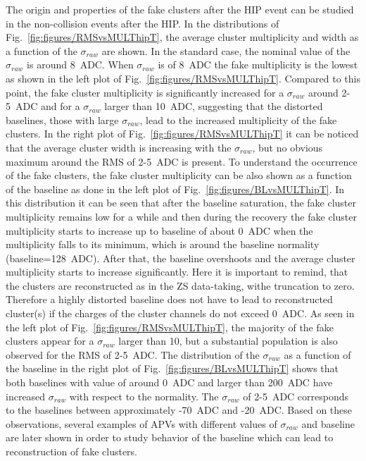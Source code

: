 The origin and properties of the fake clusters after the HIP event can be studied in the non-collision events after the HIP. In the distributions of Fig.~\ref{fig:figures/RMSvsMULThipT}, the average cluster multiplicity and width as a function of the $\sigma_{raw}$ are shown. In the standard case, the nominal value of the $\sigma_{raw}$ is around 8~ADC. When $\sigma_{raw}$ is of 8~ADC the fake multiplicity is the lowest as shown in the left plot of Fig.~\ref{fig:figures/RMSvsMULThipT}. Compared to this point, the fake cluster multiplicity is significantly increased for a $\sigma_{raw}$  around 2-5~ADC and for a $\sigma_{raw}$ larger than 10~ADC, suggesting that the distorted baselines, those with large $\sigma_{raw}$, lead to the increased multiplicity of the fake clusters. In the right plot of Fig.~\ref{fig:figures/RMSvsMULThipT} it can be noticed that the average cluster width is increasing with the $\sigma_{raw}$, but no obvious maximum around the RMS of 2-5~ADC is present. To understand the occurrence of the fake clusters, the fake cluster multiplicity can be also shown as a function of the baseline as done in the left plot of Fig.~\ref{fig:figures/BLvsMULThipT}. In this distribution it can be seen that after the baseline saturation, the fake cluster multiplicity remains low for a while and then during the recovery the fake cluster multiplicity starts to increase up to baseline of about 0~ADC when the multiplicity falls to its minimum, which is around the baseline normality (baseline=128~ADC). After that, the baseline overshoots and the average cluster multiplicity starts to increase significantly. Here it is important to remind, that the clusters are reconstructed as in the ZS data-taking, withe truncation to zero. Therefore a highly distorted baseline does not have to lead to reconstructed cluster(s) if the charges of the cluster channels do not exceed 0~ADC.  As seen in the left plot of Fig.~\ref{fig:figures/RMSvsMULThipT}, the majority of the fake clusters appear for a $\sigma_{raw}$ larger than 10, but a substantial population is also observed for the RMS of 2-5~ADC. The distribution of the $\sigma_{raw}$ as a function of the baseline in the right plot of Fig.~\ref{fig:figures/BLvsMULThipT} shows that both baselines with value of around 0~ADC and larger than 200~ADC have increased $\sigma_{raw}$ with respect to the normality. The $\sigma_{raw}$ of 2-5~ADC corresponds to the baselines between approximately -70~ADC and -20~ADC. Based on these observations, several examples of APVs with different values of $\sigma_{raw}$ and baseline are later shown in order to study behavior of the baseline which can lead to reconstruction of fake clusters.

